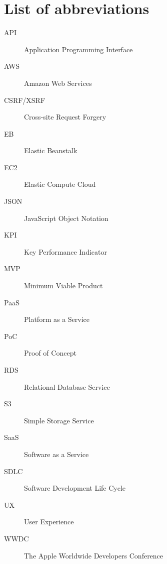 \chapter{List of abbreviations}

\begin{description}
		\item[API] Application Programming Interface
		\item[AWS] Amazon Web Services
		\item[CSRF/XSRF] Cross-site Request Forgery
		\item[EB] Elastic Beanstalk
		\item[EC2] Elastic Compute Cloud
		\item[JSON] JavaScript Object Notation
		\item[KPI] Key Performance Indicator
		\item[MVP] Minimum Viable Product
		\item[PaaS] Platform as a Service
		\item[PoC] Proof of Concept
		\item[RDS] Relational Database Service
		\item[S3] Simple Storage Service
		\item[SaaS] Software as a Service
		\item[SDLC] Software Development Life Cycle
		\item[UX] User Experience
		\item[WWDC] The Apple Worldwide Developers Conference
\end{description}
	